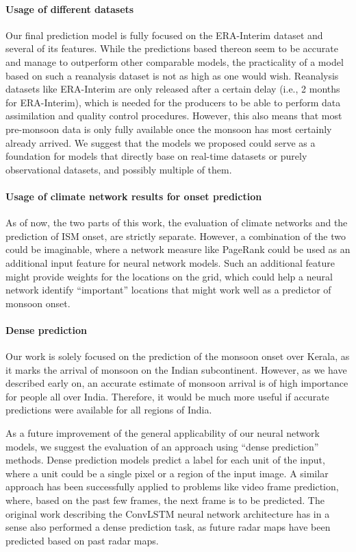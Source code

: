 \paragraph{Usage of different datasets}
Our final prediction model is fully focused on the ERA-Interim dataset and several of its features. While the predictions based thereon seem to be accurate and manage to outperform other comparable models, the practicality of a model based on such a reanalysis dataset is not as high as one would wish. Reanalysis datasets like ERA-Interim are only released after a certain delay (i.e., 2 months for ERA-Interim), which is needed for the producers to be able to perform data assimilation and quality control procedures. However, this also means that most pre-monsoon data is only fully available once the monsoon has most certainly already arrived. We suggest that the models we proposed could serve as a foundation for models that directly base on real-time datasets or purely observational datasets, and possibly multiple of them.

\paragraph{Usage of climate network results for onset prediction}
As of now, the two parts of this work, the evaluation of climate networks and the prediction of ISM onset, are strictly separate. However, a combination of the two could be imaginable, where a network measure like PageRank could be used as an additional input feature for neural network models. Such an additional feature might provide weights for the locations on the grid, which could help a neural network identify ``important'' locations that might work well as a predictor of monsoon onset.

\paragraph{Dense prediction}
Our work is solely focused on the prediction of the monsoon onset over Kerala, as it marks the arrival of monsoon on the Indian subcontinent. However, as we have described early on, an accurate estimate of monsoon arrival is of high importance for people all over India. Therefore, it would be much more useful if accurate predictions were available for all regions of India.

As a future improvement of the general applicability of our neural network models, we suggest the evaluation of an approach using ``dense prediction'' methods. Dense prediction models predict a label for each unit of the input, where a unit could be a single pixel or a region of the input image. A similar approach has been successfully applied to problems like video frame prediction, where, based on the past few frames, the next frame is to be predicted. The original work describing the ConvLSTM neural network architecture has in a sense also performed a dense prediction task, as future radar maps have been predicted based on past radar maps.

